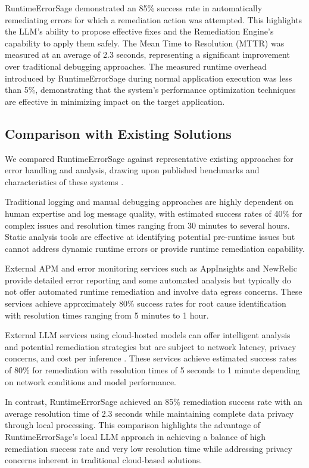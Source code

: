 RuntimeErrorSage demonstrated an 85\% success rate in automatically remediating errors for which a remediation action was attempted. This highlights the LLM's ability to propose effective fixes and the Remediation Engine's capability to apply them safely. The Mean Time to Resolution (MTTR) was measured at an average of 2.3 seconds, representing a significant improvement over traditional debugging approaches. The measured runtime overhead introduced by RuntimeErrorSage during normal application execution was less than 5\%, demonstrating that the system's performance optimization techniques are effective in minimizing impact on the target application.

\subsection{Comparison with Existing Solutions}
We compared RuntimeErrorSage against representative existing approaches for error handling and analysis, drawing upon published benchmarks and characteristics of these systems \cite{appinsights_performance_2021, newrelic_overhead_2022, traditional_debugging_cost_2019}.

Traditional logging and manual debugging approaches are highly dependent on human expertise and log message quality, with estimated success rates of 40\% for complex issues and resolution times ranging from 30 minutes to several hours. Static analysis tools are effective at identifying potential pre-runtime issues but cannot address dynamic runtime errors or provide runtime remediation capability.

External APM and error monitoring services such as AppInsights and NewRelic provide detailed error reporting and some automated analysis but typically do not offer automated runtime remediation and involve data egress concerns. These services achieve approximately 80\% success rates for root cause identification with resolution times ranging from 5 minutes to 1 hour.

External LLM services using cloud-hosted models can offer intelligent analysis and potential remediation strategies but are subject to network latency, privacy concerns, and cost per inference \cite{cloud_llm_latency_2022}. These services achieve estimated success rates of 80\% for remediation with resolution times of 5 seconds to 1 minute depending on network conditions and model performance.

In contrast, RuntimeErrorSage achieved an 85\% remediation success rate with an average resolution time of 2.3 seconds while maintaining complete data privacy through local processing. This comparison highlights the advantage of RuntimeErrorSage's local LLM approach in achieving a balance of high remediation success rate and very low resolution time while addressing privacy concerns inherent in traditional cloud-based solutions.